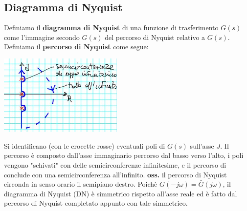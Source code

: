 \subsection{Diagramma di Nyquist}
Definiamo il \textbf{diagramma di Nyquist} di una funzione di trasferimento $G(s)$ come l'immagine secondo $G(s)$ del percorso di Nyquist relativo a $G(s)$.\newline
\newline
Definiamo il \textbf{percorso di Nyquist} come segue:
\begin{center}
    \includegraphics[height=4cm]{../lezione18/img7.JPG}
\end{center}
Si identificano (con le crocette rosse) eventuali poli di $G(s)$ sull'asse $J$. Il percorso è composto dall'asse immaginario percorso dal basso verso l'alto, i poli vengono "schivati" con delle semicirconferenze infinitesime, e il percorso di conclude con una semicirconferenza all'infinito.\newline
\newline
\textbf{oss.} il percorso di Nyquist circonda in senso orario il semipiano destro.\newline
\newline
Poichè $G(-j \omega) = \bar{G}(j \omega)$, il diagramma di Nyquist (DN) è simmetrico rispetto all'asse reale ed è fatto dal percorso di Nyquist completato appunto con tale simmetrico.
